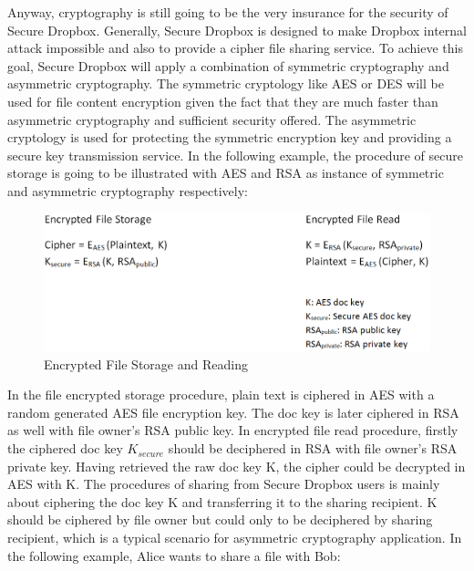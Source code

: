 Anyway, cryptography is still going to be the very insurance for the security of Secure Dropbox. Generally, Secure Dropbox is designed to make Dropbox internal attack impossible and also to provide a cipher file sharing service. To achieve this goal, Secure Dropbox will apply a combination of symmetric cryptography and asymmetric cryptography. The symmetric cryptology like AES or DES will be used for file content encryption given the fact that they are much faster than asymmetric cryptography and sufficient security offered. The asymmetric cryptology is used for protecting the symmetric encryption key and providing a secure key transmission service. In the following example, the procedure of secure storage is going to be illustrated with AES and RSA as instance of symmetric and asymmetric cryptography respectively:

\begin{figure}[h]
        \centering
        \includegraphics[width=1.0\textwidth]{figures/Encrypted_File_Storage_&_Reading.png}
        \caption[Encrypted File Storage and Reading] {Encrypted File Storage and Reading}
\end{figure}

In the file encrypted storage procedure, plain text is ciphered in AES with a random generated AES file encryption key. The doc key is later ciphered in RSA as well with file owner’s RSA public key.
In encrypted file read procedure, firstly the ciphered doc key $K_{secure}$ should be deciphered in RSA with file owner’s RSA private key. Having retrieved the raw doc key K, the cipher could be decrypted in AES with K.
The procedures of sharing from Secure Dropbox users is mainly about ciphering the doc key K and transferring it to the sharing recipient. K should be ciphered by file owner but could only to be deciphered by sharing recipient, which is a typical scenario for asymmetric cryptography application. In the following example, Alice wants to share a file with Bob:

